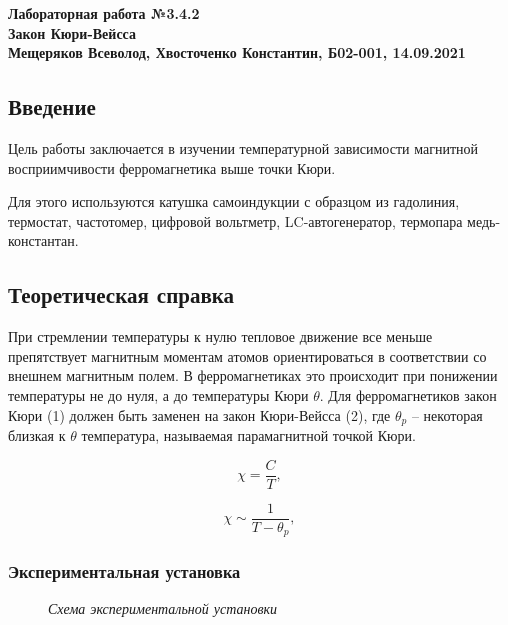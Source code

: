 \documentclass[a4paper, fontsize = 14pt]{article}
\begin{document}
\begin{center} \textbf{
Лабораторная работа №3.4.2 \\ Закон Кюри-Вейсса\\
Мещеряков Всеволод, Хвосточенко Константин, Б02-001, 14.09.2021}
\end{center} 

\subsection*{Введение}

Цель работы заключается в изучении температурной зависимости магнитной восприимчивости ферромагнетика выше точки Кюри.

Для этого используются катушка самоиндукции с образцом из гадолиния, термостат, частотомер, цифровой вольтметр, LC-автогенератор, термопара медь-константан.

\subsection*{Теоретическая справка}

При стремлении температуры к нулю тепловое движение все меньше препятствует магнитным моментам атомов ориентироваться в соответствии со внешнем магнитным полем. В ферромагнетиках это происходит при понижении температуры не до нуля, а до температуры Кюри $\theta$. Для ферромагнетиков закон Кюри (1) должен быть заменен на закон Кюри-Вейсса (2), где $\theta_p$ -- некоторая близкая к $\theta$ температура, называемая парамагнитной точкой Кюри. 

\begin{equation}
	\chi = \frac{C}{T},
\end{equation}

\begin{equation}
	\chi \sim \frac{1}{T - \theta_p},
\end{equation}

\subsubsection*{Экспериментальная установка}

\begin{figure}[hbt]\label{risI}
    \caption{\textit{Схема экспериментальной установки}}
\end{figure}
\end{document}
